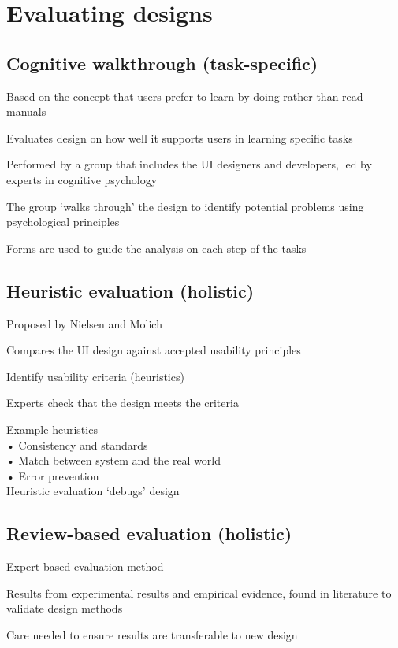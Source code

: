 \documentclass[]{project_plan}
\begin{document}
\section{Evaluating designs}

\subsection{Cognitive walkthrough (task-specific)}

Based on the concept that users prefer to learn by doing rather than read manuals

Evaluates design on how well it supports users in learning specific tasks

Performed by a group that includes the UI designers and developers, led by experts in
cognitive psychology

The group ‘walks through’ the design to identify
potential problems using psychological
principles

Forms are used to guide the analysis on each
step of the tasks

\subsection{Heuristic evaluation (holistic)}
Proposed by Nielsen and Molich

Compares the UI design against accepted usability principles

Identify usability criteria (heuristics)

Experts check that the design meets the criteria

Example heuristics\\
• Consistency and standards\\
• Match between system and the real world\\
• Error prevention\\

Heuristic evaluation ‘debugs’ design

\subsection{Review-based evaluation (holistic)}

Expert-based evaluation method

Results from experimental results and empirical evidence, found in literature to
validate design methods

Care needed to ensure results are transferable to new design
\end{document}

